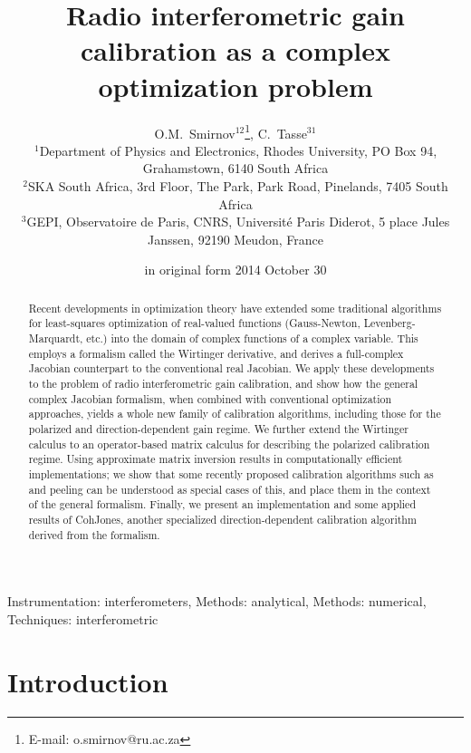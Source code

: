\documentclass[useAMS,usenatbib]{mn2e}
\title[Radio interferometric gain calibration as a complex optimization problem]{Radio interferometric gain calibration as a complex optimization problem} %
\author[O.M.~Smirnov \& C.~Tasse]{O.M.~Smirnov$^{12}$\thanks{E-mail: o.smirnov@ru.ac.za}, C.~Tasse$^{31}$\\
$^1$Department of Physics and Electronics, Rhodes University, PO Box 94, Grahamstown, 6140 South Africa\\
$^2$SKA South Africa, 3rd Floor, The Park, Park Road, Pinelands, 7405 South Africa\\
$^3$GEPI, Observatoire de Paris, CNRS, Universit\'e Paris Diderot,
5 place Jules Janssen, 92190 Meudon, France}
\newcommand{\StefCal}{{\sc StefCal}}
\numberwithin{equation}{section} %
\begin{document}
\date{in original form 2014 October 30}

\pagerange{\pageref{firstpage}--\pageref{lastpage}} 

\maketitle

\label{firstpage}

\begin{abstract}
Recent developments in optimization theory have extended some traditional algorithms for least-squares optimization of 
real-valued functions (Gauss-Newton, Levenberg-Marquardt, etc.) into the domain of complex functions of a complex 
variable. This employs a formalism called the Wirtinger derivative, and derives a full-complex Jacobian counterpart 
to the conventional real Jacobian. We apply these developments to the problem of radio interferometric gain 
calibration, and show how the general complex Jacobian formalism, when combined with conventional optimization 
approaches, yields a whole new family of calibration algorithms, including those for the polarized and 
direction-dependent gain regime. We further extend the Wirtinger calculus to an operator-based matrix calculus 
for describing the polarized calibration regime. Using approximate matrix 
inversion results in computationally efficient implementations; we show that some recently proposed calibration algorithms 
such as {\sc \StefCal} and peeling can be understood as special cases of this, and place them in the context of the general 
formalism. Finally, we present an implementation and some applied results of {\sc CohJones}, another specialized 
direction-dependent calibration algorithm derived from the formalism.

\end{abstract}

\begin{keywords}
Instrumentation: interferometers, Methods: analytical, Methods: numerical, Techniques: interferometric
\end{keywords}

\section*{Introduction}
\end{document}

